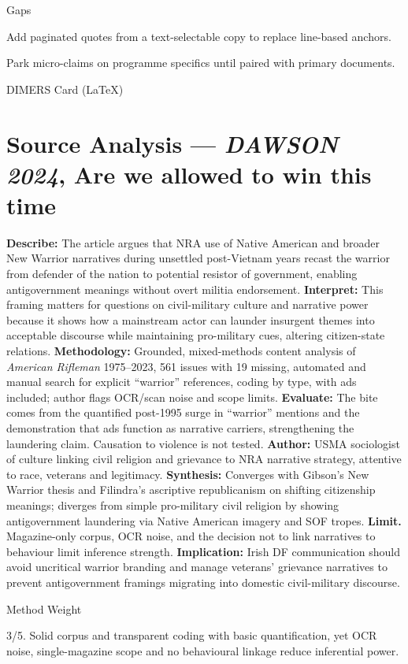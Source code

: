 Gaps

Add paginated quotes from a text-selectable copy to replace line-based anchors.

Park micro-claims on programme specifics until paired with primary documents.

DIMERS Card (LaTeX)

\section*{Source Analysis — \textit{DAWSON 2024}, Are we allowed to win this time}
\textbf{Describe:} The article argues that NRA use of Native American and broader New Warrior narratives during unsettled post-Vietnam years recast the warrior from defender of the nation to potential resistor of government, enabling antigovernment meanings without overt militia endorsement.
\textbf{Interpret:} This framing matters for questions on civil-military culture and narrative power because it shows how a mainstream actor can launder insurgent themes into acceptable discourse while maintaining pro-military cues, altering citizen-state relations.
\textbf{Methodology:} Grounded, mixed-methods content analysis of \textit{American Rifleman} 1975–2023, 561 issues with 19 missing, automated and manual search for explicit “warrior” references, coding by type, with ads included; author flags OCR/scan noise and scope limits.
\textbf{Evaluate:} The bite comes from the quantified post-1995 surge in “warrior” mentions and the demonstration that ads function as narrative carriers, strengthening the laundering claim. Causation to violence is not tested.
\textbf{Author:} USMA sociologist of culture linking civil religion and grievance to NRA narrative strategy, attentive to race, veterans and legitimacy.
\textbf{Synthesis:} Converges with Gibson’s New Warrior thesis and Filindra’s ascriptive republicanism on shifting citizenship meanings; diverges from simple pro-military civil religion by showing antigovernment laundering via Native American imagery and SOF tropes.
\textbf{Limit.} Magazine-only corpus, OCR noise, and the decision not to link narratives to behaviour limit inference strength.
\textbf{Implication:} Irish DF communication should avoid uncritical warrior branding and manage veterans’ grievance narratives to prevent antigovernment framings migrating into domestic civil-military discourse.

Method Weight

3/5. Solid corpus and transparent coding with basic quantification, yet OCR noise, single-magazine scope and no behavioural linkage reduce inferential power.

